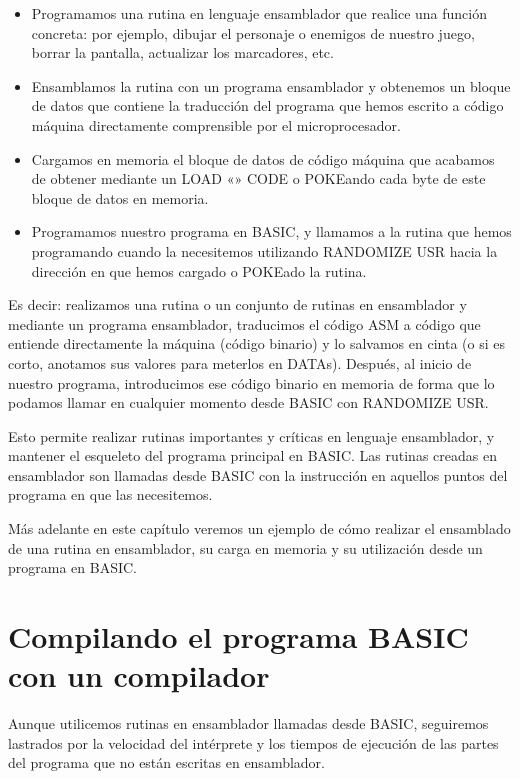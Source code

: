 \documentclass[letterpaper,10pt,spanish]{sphinxmanual}
\begin{document}
\begin{itemize}
\item {} 
Programamos una rutina en lenguaje ensamblador que realice una función concreta: por ejemplo, dibujar el personaje o enemigos de nuestro juego, borrar la pantalla, actualizar los marcadores, etc.

\item {} 
Ensamblamos la rutina con un programa ensamblador y obtenemos un bloque de datos que contiene la traducción del programa que hemos escrito a código máquina directamente comprensible por el microprocesador.

\item {} 
Cargamos en memoria el bloque de datos de código máquina que acabamos de obtener mediante un LOAD «» CODE o POKEando cada byte de este bloque de datos en memoria.

\item {} 
Programamos nuestro programa en BASIC, y llamamos a la rutina que hemos programando cuando la necesitemos utilizando RANDOMIZE USR hacia la dirección en que hemos cargado o POKEado la rutina.

\end{itemize}

Es decir: realizamos una rutina o un conjunto de rutinas en ensamblador y mediante un programa ensamblador, traducimos el código ASM a código que entiende directamente la máquina (código binario) y lo salvamos en cinta (o si es corto, anotamos sus valores para meterlos en DATAs). Después, al inicio de nuestro programa, introducimos ese código binario en memoria de forma que lo podamos llamar en cualquier momento desde BASIC con RANDOMIZE USR.

Esto permite realizar rutinas importantes y críticas en lenguaje ensamblador, y mantener el esqueleto del programa principal en BASIC. Las rutinas creadas en ensamblador son llamadas desde BASIC con la instrucción  en aquellos puntos del programa en que las necesitemos.

Más adelante en este capítulo veremos un ejemplo de cómo realizar el ensamblado de una rutina en ensamblador, su carga en memoria y su utilización desde un programa en BASIC.


\section{Compilando el programa BASIC con un compilador}
\label{\detokenize{02_introduccion/introduccion:compilando-el-programa-basic-con-un-compilador}}
Aunque utilicemos rutinas en ensamblador llamadas desde BASIC, seguiremos lastrados por la velocidad del intérprete y los tiempos de ejecución de las partes del programa que no están escritas en ensamblador.
\end{document}
